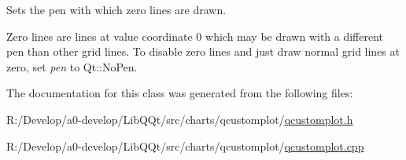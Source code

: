 Sets the pen with which zero lines are drawn.

Zero lines are lines at value coordinate 0 which may be drawn with a different pen than other grid lines. To disable zero lines and just draw normal grid lines at zero, set {\itshape pen} to Qt\+::\+No\+Pen. 

The documentation for this class was generated from the following files\+:\begin{DoxyCompactItemize}
\item 
R\+:/\+Develop/a0-\/develop/\+Lib\+Q\+Qt/src/charts/qcustomplot/\mbox{\hyperlink{qcustomplot_8h}{qcustomplot.\+h}}\item 
R\+:/\+Develop/a0-\/develop/\+Lib\+Q\+Qt/src/charts/qcustomplot/\mbox{\hyperlink{qcustomplot_8cpp}{qcustomplot.\+cpp}}\end{DoxyCompactItemize}
